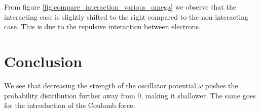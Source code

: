 \documentclass[a4paper]{article}
\begin{document}
From figure \ref{fig:compare_interaction_various_omega} we observe that the interacting case is slightly shifted to the right compared to the non-interacting case. This is due to the repulsive interaction between electrons.


\section{Conclusion}\label{sec:conclusion}
We see that decreasing the strength of the oscillator potential $\omega$ pushes the probability distribution further away from 0, making it shallower. The same goes for the introduction of the Coulomb force.


%
%

{}
\end{document}
